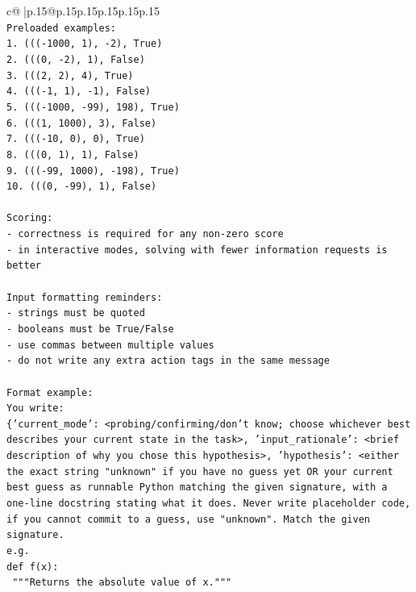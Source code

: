 \documentclass{article}
\begin{document}
{\begin{supertabular}{c@{$\;$}|p{.15\linewidth}@{}p{.15\linewidth}p{.15\linewidth}p{.15\linewidth}p{.15\linewidth}p{.15\linewidth}}
{{{\\ 
\texttt{Preloaded examples:} \\
\texttt{1. ((({-}1000, 1), {-}2), True)} \\
\texttt{2. (((0, {-}2), 1), False)} \\
\texttt{3. (((2, 2), 4), True)} \\
\texttt{4. ((({-}1, 1), {-}1), False)} \\
\texttt{5. ((({-}1000, {-}99), 198), True)} \\
\texttt{6. (((1, 1000), 3), False)} \\
\texttt{7. ((({-}10, 0), 0), True)} \\
\texttt{8. (((0, 1), 1), False)} \\
\texttt{9. ((({-}99, 1000), {-}198), True)} \\
\texttt{10. (((0, {-}99), 1), False)} \\
\\ 
\texttt{Scoring:} \\
\texttt{{-} correctness is required for any non{-}zero score} \\
\texttt{{-} in interactive modes, solving with fewer information requests is better} \\
\\ 
\texttt{Input formatting reminders:} \\
\texttt{{-} strings must be quoted} \\
\texttt{{-} booleans must be True/False} \\
\texttt{{-} use commas between multiple values} \\
\texttt{{-} do not write any extra action tags in the same message} \\
\\ 
\texttt{Format example:} \\
\texttt{You write:} \\
\texttt{\{'current\_mode': <probing/confirming/don't know; choose whichever best describes your current state in the task>, 'input\_rationale': <brief description of why you chose this hypothesis>, 'hypothesis': <either the exact string "unknown" if you have no guess yet OR your current best guess as runnable Python matching the given signature, with a one{-}line docstring stating what it does. Never write placeholder code, if you cannot commit to a guess, use "unknown". Match the given signature.} \\
\texttt{e.g.} \\
\texttt{def f(x):} \\
\texttt{	"""Returns the absolute value of x."""} \\
}}}
\end{supertabular}}
\end{document}
